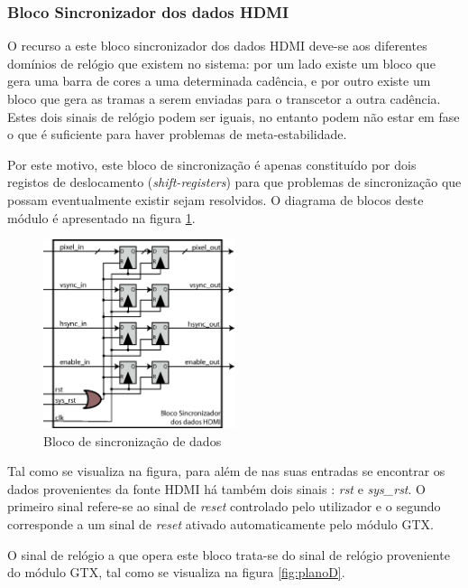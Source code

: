 \documentclass[11pt,a4paper]{article}
\begin{document}
	\subsubsection*{Bloco Sincronizador dos dados HDMI} \label{subsub:serial_syncsignals}
	
	O recurso a este bloco sincronizador dos dados HDMI deve-se aos diferentes domínios de relógio que existem no sistema: por um lado existe um bloco que gera uma barra de cores a uma determinada cadência, e por outro existe um bloco que gera as tramas a serem enviadas para o transcetor a outra cadência. Estes dois sinais de relógio podem ser iguais, no entanto podem não estar em fase o que é suficiente para haver problemas de meta-estabilidade. 
	
	Por este motivo, este bloco de sincronização é apenas constituído por dois registos de deslocamento (\textit{shift-registers}) para que problemas de sincronização que possam eventualmente existir sejam resolvidos. O diagrama de blocos deste módulo é apresentado na figura \ref{fig:sync_block}. 
	
	\begin{figure}[h!]
		\begin{center}
			\leavevmode
			\includegraphics[width=0.5\textwidth]{sync_block_from_HDMI}
			\caption[Bloco de sincronização de dados]{Bloco de sincronização de dados}
			\label{fig:sync_block}
		\end{center}
	\end{figure}
	
	Tal como se visualiza na figura, para além de nas suas entradas se encontrar os dados provenientes da fonte HDMI há também dois sinais : \textit{rst} e \textit{sys\_rst}. O primeiro sinal refere-se ao sinal de \textit{reset} controlado pelo utilizador e o segundo corresponde a um sinal de \textit{reset} ativado automaticamente pelo módulo GTX.
	
	O sinal de relógio a que opera este bloco trata-se do sinal de relógio proveniente do módulo GTX, tal como se visualiza na figura \ref{fig:planoD}.
	
\end{document}
